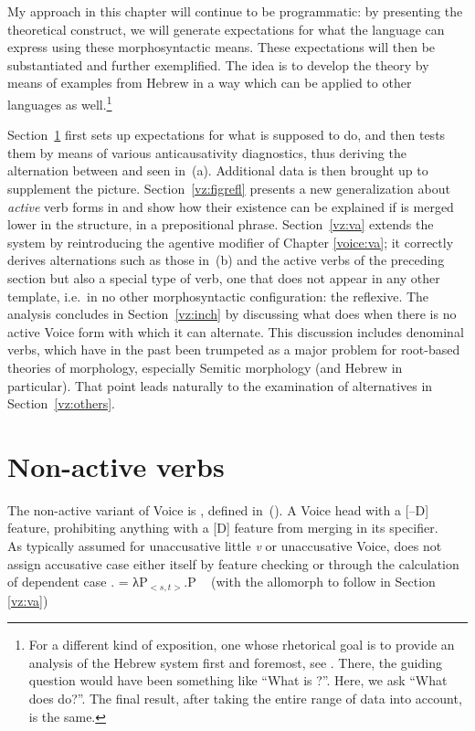 My approach in this chapter will continue to be programmatic: by presenting the theoretical construct, we will generate expectations for what the language can express using these morphosyntactic means. These expectations will then be substantiated and further exemplified. The idea is to develop the theory by means of examples from Hebrew in a way which can be applied to other languages as well.\footnote{For a different kind of exposition, one whose rhetorical goal is to provide an analysis of the Hebrew system first and foremost, see \cite{kastner16phd}. There, the guiding question would have been something like ``What is {\tnif}?''. Here, we ask ``What does {\vz} do?''. The final result, after taking the entire range of data into account, is the same.}

Section~\ref{vz:nact} first sets up expectations for what {\vz} is supposed to do, and then tests them by means of various anticausativity diagnostics, thus deriving the alternation between {\tkal} and {\tnif} seen in~(\lastx a). Additional data is then brought up to supplement the picture. Section~\ref{vz:figrefl} presents a new generalization about \emph{active} verb forms in {\tnif} and show how their existence can be explained if {\vz} is merged lower in the structure, in a prepositional phrase. Section~\ref{vz:va} extends the system by reintroducing the agentive modifier {\va} of Chapter \ref{voice:va}; it correctly derives alternations such as those in~(\lastx b) and the active verbs of the preceding section but also a special type of verb, one that does not appear in any other template, i.e.~in no other morphosyntactic configuration: the reflexive. The analysis concludes in Section~\ref{vz:inch} by discussing what {\vz} does when there is no active Voice form with which it can alternate. This discussion includes denominal verbs, which have in the past been trumpeted as a major problem for root-based theories of morphology, especially Semitic morphology (and Hebrew in particular). That point leads naturally to the examination of alternatives in Section~\ref{vz:others}.





\section{Non-active verbs} \label{vz:nact}
The non-active variant of Voice is {\vz}, defined in~(\nextx).
\pex \textbf{\vz}
	\a A Voice head with a [--D] feature, prohibiting anything with a [D] feature from merging in its specifier.\\
    As typically assumed for unaccusative little \emph{v} or unaccusative Voice, {\vz} does not assign accusative case either itself by feature checking \citep{chomsky95} or through the calculation of dependent case \citep{marantz91}.
	\a \denote{{\vz}} = λP$_{<s,t>}$.P
	\a {\vz} \lra~{\tnif} \hfill (with the allomorph {\thit} to follow in Section \ref{vz:va})
\xe


